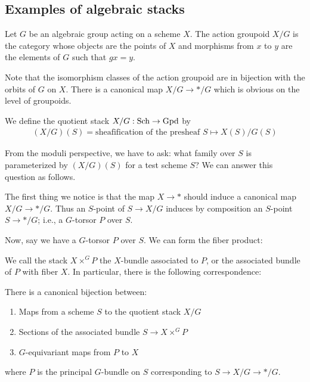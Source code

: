 \documentclass[12pt]{article}
\begin{document}
\subsection{Examples of algebraic stacks}
\begin{definition}
    Let $G$ be an algebraic group acting on a scheme $X$. The action groupoid $X/G$ is the category whose objects are the points of $X$ and morphisms from $x$ to $y$ are the elements of $G$ such that $gx = y$.
\end{definition} Note that the isomorphism classes of the action groupoid are in bijection with
the orbits of $G $ on $X$. There is a canonical map $X/G \to */G$ which is obvious on the level of groupoids.

\begin{definition}
    We define the quotient stack $X/G: \operatorname{Sch} \to \operatorname{Gpd}$ by \begin{align*}
        (X/G)(S) = \text{sheafification of the presheaf } S \mapsto X(S)/G(S)
    \end{align*}
\end{definition}
From the moduli perspective, we have to ask: what family over $S$ is parameterized by $(X/G)(S)$ for a test scheme $S$? We can answer this question as follows.

The first thing we notice is that the map $X \rightarrow *$ should induce a canonical map $X/G \rightarrow */G$. Thus an $S$-point of $S \rightarrow X/G$ induces by composition an $S$-point $S \rightarrow */G$; i.e., a $G$-torsor $P$ over $S$.

Now, say we have a $G$-torsor $P$ over $S$. We can form the fiber product:

\begin{center}
\end{center}

We call the stack $X \times^G P$ the $X$-bundle associated to $P$, or the associated bundle of $P$ with
fiber $X$. In particular, there is the following correspondence:

\begin{proposition}
    There is a canonical bijection between:

    \begin{enumerate}
        \item Maps from a scheme $S$ to the quotient stack $X/G$
        \item Sections of the associated bundle $S \to X \times^G P$
        \item $G$-equivariant maps from $P$ to $X$
    \end{enumerate} where $P$ is the principal $G$-bundle on $S$ corresponding to $S \to X/G \to */G$.
\end{proposition}
\end{document}
